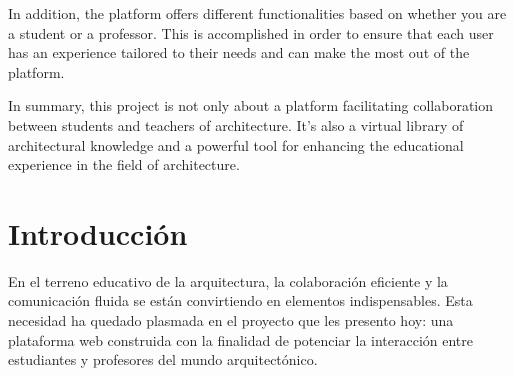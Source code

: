\documentclass[a4paper, 12pt]{book}
\begin{document}
In addition, the platform offers different functionalities based on whether you are a student or a professor. This is accomplished 
in order to ensure that each user has an experience tailored to their needs and can make the most out of the platform.

In summary, this project is not only about a platform facilitating collaboration between students and teachers of architecture. It's 
also a virtual library of architectural knowledge and a powerful tool for enhancing the educational experience in the field of 
architecture.



\tableofcontents 
\cleardoublepage
\listoffigures %



\cleardoublepage
\chapter{Introducción}
\label{sec:intro} %

En el terreno educativo de la arquitectura, la colaboración eficiente y la comunicación fluida se están convirtiendo en elementos 
indispensables. Esta necesidad ha quedado plasmada en el proyecto que les presento hoy: una plataforma web construida con la finalidad 
de potenciar la interacción entre estudiantes y profesores del mundo arquitectónico.
\end{document}
